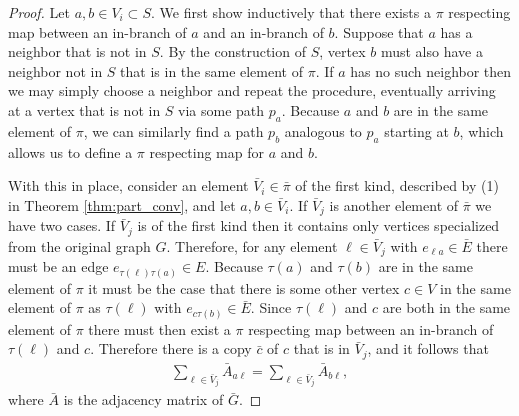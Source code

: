 \documentclass[12pt]{thesis}
\begin{document}
\begin{proof}
Let $a,b\in V_i\subset S$.
We first show inductively that there exists a $\pi$ respecting map between an in-branch of $a$ and an in-branch of $b$.
Suppose that $a$ has a neighbor that is not in $S$.
By the construction of $S$, vertex $b$ must also have a neighbor not in $S$ that is in the same element of $\pi$.
If $a$ has no such neighbor then we may simply choose a neighbor and repeat the procedure, eventually arriving at a vertex that is not in $S$ via some path $p_a$.
Because $a$ and $b$ are in the same element of $\pi$, we can similarly find a path $p_b$ analogous to $p_a$ starting at $b$, which allows us to define a $\pi$ respecting map for $a$ and $b$.

With this in place, consider an element $\bar{V}_i\in\bar{\pi}$ of the first kind, described by (1) in Theorem \ref{thm:part_conv}, and let $a,b\in \bar{V}_i$.
If $\bar{V}_j$ is another element of $\bar{\pi}$ we have two cases. If $\bar{V}_j$ is of the first kind then it contains only vertices specialized from the original graph $G$.
Therefore, for any element $\ell\in \bar{V}_j$ with $e_{\ell a}\in\bar{E}$ there must be {an} edge $e_{\tau(\ell)\tau(a)}\in E$.
Because $\tau(a)$ and $\tau(b)$ are in the same element of $\pi$ it must be the case that there is some other vertex $c\in V$ in the same element of $\pi$ as $\tau(\ell)$ with $e_{c\tau(b)}\in\bar{E}$.
Since $\tau(\ell)$ and $c$ are both in the same element of $\pi$ there must then exist a $\pi$ respecting map between an in-branch of $\tau(\ell)$ and $c$.
Therefore there is a copy $\bar{c}$ of $c$ that is in $\bar{V}_j$, and it follows that 
\begin{align*}
    \sum_{\ell\in \bar{V}_j}\bar{A}_{a\ell} = \sum_{\ell\in \bar{V}_j}\bar{A}_{b\ell},
\end{align*}
where $\bar{A}$ is the adjacency matrix of $\bar{G}$.


\end{proof}
\end{document}

